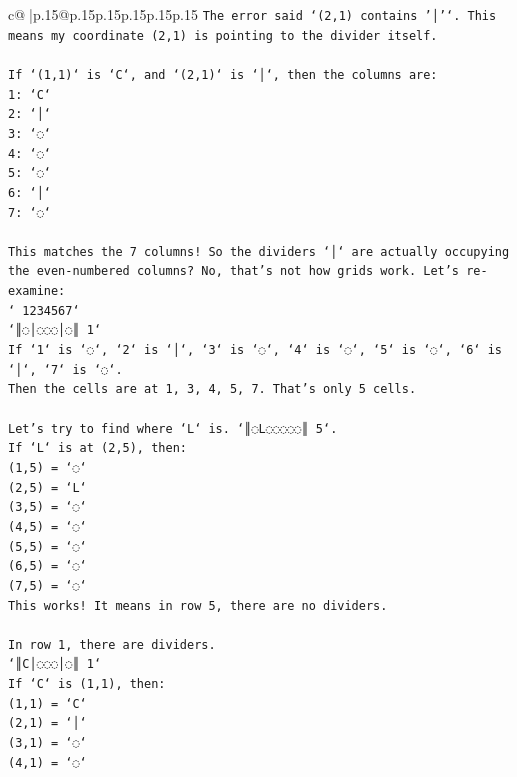 \documentclass{article}
\begin{document}
{\begin{supertabular}{c@{$\;$}|p{.15\linewidth}@{}p{.15\linewidth}p{.15\linewidth}p{.15\linewidth}p{.15\linewidth}p{.15\linewidth}}
{{{\texttt{The error said `(2,1) contains '│'`. This means my coordinate (2,1) is pointing to the divider itself.} \\
\\ 
\texttt{If `(1,1)` is `C`, and `(2,1)` is `│`, then the columns are:} \\
\texttt{1: `C`} \\
\texttt{2: `│`} \\
\texttt{3: `◌`} \\
\texttt{4: `◌`} \\
\texttt{5: `◌`} \\
\texttt{6: `│`} \\
\texttt{7: `◌`} \\
\\ 
\texttt{This matches the 7 columns! So the dividers `│` are actually occupying the even{-}numbered columns? No, that's not how grids work. Let's re{-}examine:} \\
\texttt{` 1234567`} \\
\texttt{`║◌│◌◌◌│◌║ 1`} \\
\texttt{If `1` is `◌`, `2` is `│`, `3` is `◌`, `4` is `◌`, `5` is `◌`, `6` is `│`, `7` is `◌`.} \\
\texttt{Then the cells are at 1, 3, 4, 5, 7. That's only 5 cells.} \\
\\ 
\texttt{Let's try to find where `L` is. `║◌L◌◌◌◌◌║ 5`.} \\
\texttt{If `L` is at (2,5), then:} \\
\texttt{(1,5) = `◌`} \\
\texttt{(2,5) = `L`} \\
\texttt{(3,5) = `◌`} \\
\texttt{(4,5) = `◌`} \\
\texttt{(5,5) = `◌`} \\
\texttt{(6,5) = `◌`} \\
\texttt{(7,5) = `◌`} \\
\texttt{This works! It means in row 5, there are no dividers.} \\
\\ 
\texttt{In row 1, there are dividers.} \\
\texttt{`║C│◌◌◌│◌║ 1`} \\
\texttt{If `C` is (1,1), then:} \\
\texttt{(1,1) = `C`} \\
\texttt{(2,1) = `│`} \\
\texttt{(3,1) = `◌`} \\
\texttt{(4,1) = `◌`} \\
}}}
\end{supertabular}}
\end{document}
